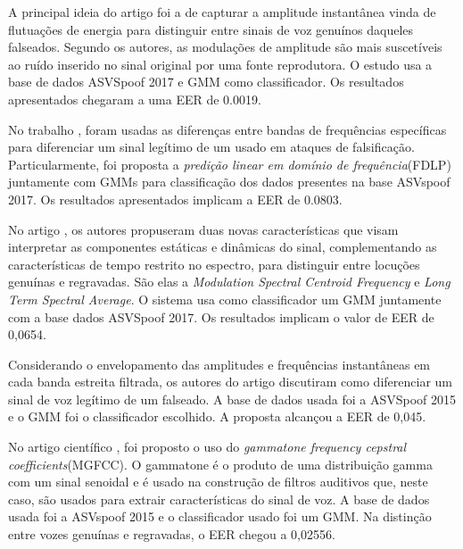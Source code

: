 		\par A principal ideia do artigo \cite{ISI:000465363900136} foi a de capturar a amplitude instantânea vinda de flutuações de energia para distinguir entre sinais de voz genuínos daqueles falseados. Segundo os autores, as modulações de amplitude são mais suscetíveis ao ruído inserido no sinal original por uma fonte reprodutora. O estudo usa a base de dados ASVSpoof 2017 e GMM como classificador. Os resultados apresentados chegaram a uma EER de 0.0019.\\

		\par No trabalho \cite{ISI:000465363900139}, foram usadas as diferenças entre bandas de frequências específicas para diferenciar um sinal legítimo de um usado em ataques de falsificação. Particularmente, foi proposta a \textit{predição linear em domínio de frequência}(FDLP) juntamente com GMMs para classificação dos dados presentes na base ASVspoof  2017. Os resultados apresentados implicam a EER de 0.0803.\\
		
		\par No artigo \cite{Suthokumar2018}, os autores propuseram duas novas características que visam interpretar as componentes estáticas e dinâmicas do sinal, complementando as características de tempo restrito no espectro, para distinguir entre locuções genuínas e regravadas. São elas a \textit{Modulation  Spectral Centroid Frequency} e \textit{Long Term Spectral Average}. O sistema usa como classificador um GMM juntamente com a base dados ASVSpoof 2017. Os resultados implicam o valor de EER de 0,0654.\\
		
		\par Considerando o envelopamento das amplitudes e  frequências instantâneas em cada banda estreita filtrada, os autores do artigo \cite{ISI:000458728700054} discutiram como diferenciar um sinal de voz legítimo de um falseado. A base de dados usada foi a  ASVSpoof 2015 e o GMM foi o classificador escolhido. A proposta alcançou a EER de 0,045.\\

		\par No artigo científico \cite{ISI:000392503100008}, foi proposto o uso do \textit{gammatone frequency cepstral coefficients}(MGFCC). O gammatone é o produto de uma distribuição gamma com um sinal senoidal e é usado na construção de filtros auditivos que, neste caso, são usados para extrair características do sinal de voz. A base de dados usada foi a ASVspoof 2015 e o classificador usado foi um GMM. Na distinção entre vozes genuínas e regravadas, o EER chegou a 0,02556.\\
		
